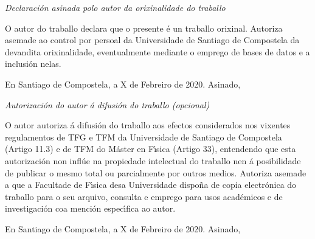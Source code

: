 \thispagestyle{empty}
\pagebreak

{\sl Declaraci\'on asinada polo autor da orixinalidade do traballo}

O autor do traballo declara que o presente \'e un traballo orixinal. Autoriza asemade ao control por persoal da Universidade de Santiago de Compostela da devandita orixinalidade, eventualmente mediante o emprego de bases de datos e a inclusi\'on nelas.

En Santiago de Compostela, a X de Febreiro de 2020. Asinado,\vspace{3cm}


{\sl Autorizaci\'on do autor \'a difusi\'on do traballo (opcional)}

O  autor autoriza \'a difusi\'on do traballo aos efectos considerados nos vixentes regulamentos de TFG e TFM da Universidade de Santiago de Compostela (Artigo 11.3) e de TFM do M\'aster en F\'{\i}sica (Artigo 33), entendendo que esta autorizaci\'on non infl\'ue na propiedade intelectual do traballo nen \'a posibilidade de publicar o mesmo total ou parcialmente por outros medios. Autoriza asemade a que a Facultade de F\'{\i}sica desa Universidade dispo\~na de copia electr\'onica do traballo para o seu arquivo, consulta e emprego para usos acad\'emicos e de investigaci\'on coa menci\'on espec\'{\i}fica ao autor. 

En Santiago de Compostela, a X de Febreiro de 2020. Asinado,\

\thispagestyle{empty}
\pagebreak